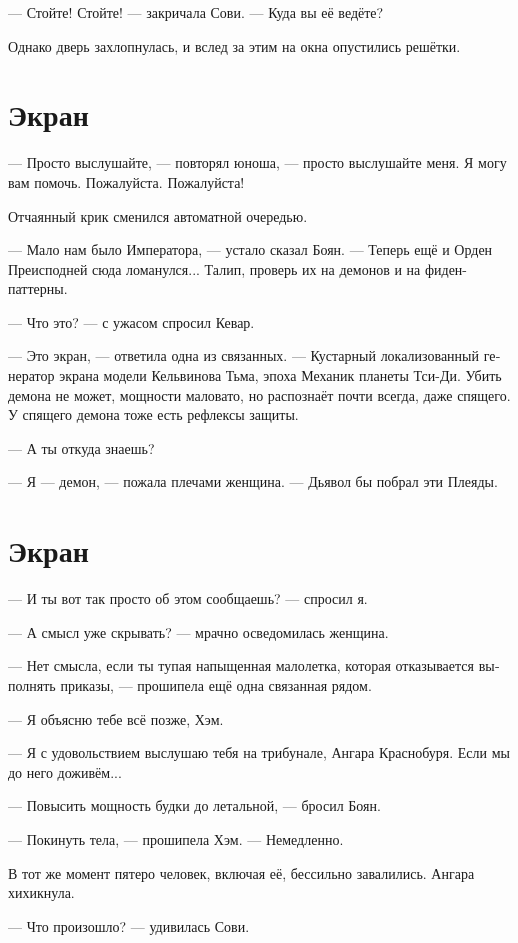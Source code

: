 \documentclass[a4paper,12pt,fleqn]{book}\usepackage{polyglossia}\setdefaultlanguage[babelshorthands=true]{russian}\setotherlanguage{english}\defaultfontfeatures{Ligatures=TeX,Mapping=tex-text}
\begin{document}
--- Стойте!
Стойте! --- закричала Сови.
--- Куда вы её ведёте?

Однако дверь захлопнулась, и вслед за этим на окна опустились решётки.

\section{Экран}

--- Просто выслушайте, --- повторял юноша, --- просто выслушайте меня.
Я могу вам помочь.
Пожалуйста.
Пожалуйста!

Отчаянный крик сменился автоматной очередью.

--- Мало нам было Императора, --- устало сказал Боян.
--- Теперь ещё и Орден Преисподней сюда ломанулся...
Талип, проверь их на демонов и на фиден-паттерны.

--- Что это? --- с ужасом спросил Кевар.

--- Это экран, --- ответила одна из связанных.
--- Кустарный локализованный генератор экрана модели Кельвинова Тьма, эпоха Механик планеты Тси-Ди.
Убить демона не может, мощности маловато, но распознаёт почти всегда, даже спящего.
У спящего демона тоже есть рефлексы защиты.

--- А ты откуда знаешь?

--- Я --- демон, --- пожала плечами женщина.
--- Дьявол бы побрал эти Плеяды.

\section{Экран}

--- И ты вот так просто об этом сообщаешь? --- спросил я.

--- А смысл уже скрывать? --- мрачно осведомилась женщина.

--- Нет смысла, если ты тупая напыщенная малолетка, которая отказывается выполнять приказы, --- прошипела ещё одна связанная рядом.

--- Я объясню тебе всё позже, Хэм.

--- Я с удовольствием выслушаю тебя на трибунале, Ангара Краснобуря.
Если мы до него доживём...

--- Повысить мощность будки до летальной, --- бросил Боян.

--- Покинуть тела, --- прошипела Хэм.
--- Немедленно.

В тот же момент пятеро человек, включая её, бессильно завалились.
Ангара хихикнула.

--- Что произошло? --- удивилась Сови.
\end{document}
